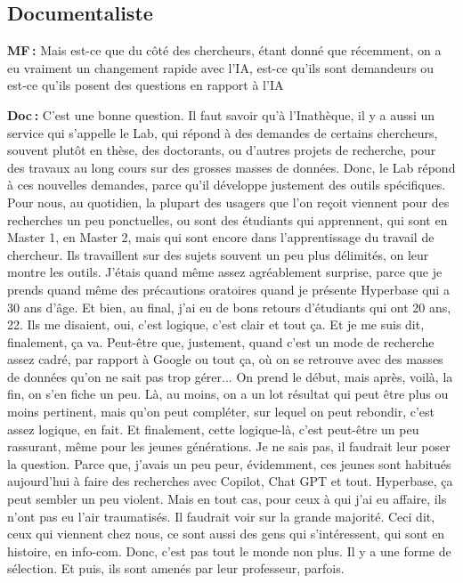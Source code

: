 \subsection*{Documentaliste} 

\textbf{MF :} Mais est-ce que du côté des chercheurs, étant donné que récemment, on a eu vraiment un changement rapide avec l'IA, est-ce qu'ils sont demandeurs ou est-ce qu'ils posent des questions en rapport à l'IA 

\textbf{Doc :} C'est une bonne question. Il faut savoir qu'à l’Inathèque, il y a aussi un service qui s'appelle le Lab, qui répond à des demandes de certains chercheurs, souvent plutôt en thèse, des doctorants, ou d’autres projets de recherche, pour des travaux au long cours sur des grosses masses de données. Donc, le Lab répond à ces nouvelles demandes, parce qu'il développe justement des outils spécifiques. Pour nous, au quotidien, la plupart des usagers que l'on reçoit viennent pour des recherches un peu ponctuelles, ou sont des étudiants qui apprennent, qui sont en Master 1, en Master 2, mais qui sont encore dans l'apprentissage du travail de chercheur. Ils travaillent sur des sujets souvent un peu plus délimités, on leur montre les outils. J'étais quand même assez agréablement surprise, parce que je prends quand même des précautions oratoires quand je présente Hyperbase qui a 30 ans d’âge. Et bien, au final, j'ai eu de bons retours d'étudiants qui ont 20 ans, 22. Ils me disaient, oui, c'est logique, c'est clair et tout ça. Et je me suis dit, finalement, ça va. Peut-être que, justement, quand c’est un mode de recherche assez cadré, par rapport à Google ou tout ça, où on se retrouve avec des masses de données qu'on ne sait pas trop gérer... On prend le début, mais après, voilà, la fin, on s'en fiche un peu. Là, au moins, on a un lot résultat qui peut être plus ou moins pertinent, mais qu'on peut compléter, sur lequel on peut rebondir, c'est assez logique, en fait. Et finalement, cette logique-là, c'est peut-être un peu rassurant, même pour les jeunes générations.  Je ne sais pas, il faudrait leur poser la question. Parce que, j'avais un peu peur, évidemment, ces jeunes sont habitués aujourd'hui à faire des recherches avec Copilot, Chat GPT et tout. Hyperbase, ça peut sembler un peu violent. Mais en tout cas, pour ceux à qui j'ai eu affaire, ils n’ont pas eu l’air traumatisés. Il faudrait voir sur la grande majorité. Ceci dit, ceux qui viennent chez nous, ce sont aussi des gens qui s'intéressent, qui sont en histoire, en info-com. Donc, c'est pas tout le monde non plus. Il y a une forme de sélection. Et puis, ils sont amenés par leur professeur, parfois. 

